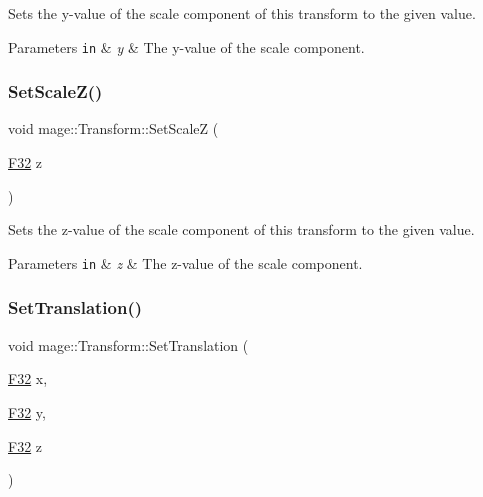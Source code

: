 Sets the y-\/value of the scale component of this transform to the given value.


\begin{DoxyParams}[1]{Parameters}
\mbox{\tt in}  & {\em y} & The y-\/value of the scale component. \\
\hline
\end{DoxyParams}
\hypertarget{classmage_1_1_transform_aa8fa7169c739cd1e005bbb373ccbf6c3}{}\label{classmage_1_1_transform_aa8fa7169c739cd1e005bbb373ccbf6c3} 
\subsubsection{\texorpdfstring{Set\+Scale\+Z()}{SetScaleZ()}}
{\footnotesize\ttfamily void mage\+::\+Transform\+::\+Set\+ScaleZ (\begin{DoxyParamCaption}\item[{\hyperlink{namespacemage_aa97e833b45f06d60a0a9c4fc22ae02c0}{F32}}]{z }\end{DoxyParamCaption})\hspace{0.3cm}{\ttfamily [noexcept]}}

Sets the z-\/value of the scale component of this transform to the given value.


\begin{DoxyParams}[1]{Parameters}
\mbox{\tt in}  & {\em z} & The z-\/value of the scale component. \\
\hline
\end{DoxyParams}
\hypertarget{classmage_1_1_transform_afb794877f9b538b5ce4b55e4cd8852f0}{}\label{classmage_1_1_transform_afb794877f9b538b5ce4b55e4cd8852f0} 
\subsubsection{\texorpdfstring{Set\+Translation()}{SetTranslation()}\hspace{0.1cm}{\footnotesize\ttfamily [1/4]}}
{\footnotesize\ttfamily void mage\+::\+Transform\+::\+Set\+Translation (\begin{DoxyParamCaption}\item[{\hyperlink{namespacemage_aa97e833b45f06d60a0a9c4fc22ae02c0}{F32}}]{x,  }\item[{\hyperlink{namespacemage_aa97e833b45f06d60a0a9c4fc22ae02c0}{F32}}]{y,  }\item[{\hyperlink{namespacemage_aa97e833b45f06d60a0a9c4fc22ae02c0}{F32}}]{z }\end{DoxyParamCaption})\hspace{0.3cm}{\ttfamily [noexcept]}}

